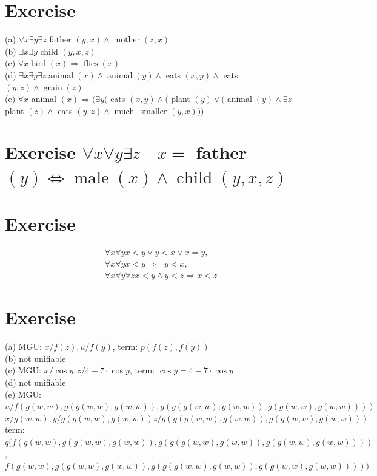 \documentclass[10pt]{book}
\begin{document}
\section{Exercise}
(a) $\forall x \exists y \exists z$ father $(y, x) \wedge \operatorname{mother}(z, x)$\\
(b) $\exists x \exists y$ child $(y, x, z)$\\
(c) $\forall x \operatorname{bird}(x) \Rightarrow \operatorname{flies}(x)$\\
(d) $\exists x \exists y \exists z \operatorname{animal}(x) \wedge \operatorname{animal}(y) \wedge$ eats $(x, y) \wedge$ eats $(y, z) \wedge \operatorname{grain}(z)$\\
(e) $\forall x$ animal $(x) \Rightarrow(\exists y($ eats $(x, y) \wedge($ plant $(y) \vee(\operatorname{animal}(y) \wedge \exists z$ plant $(z) \wedge$ eats $(y, z) \wedge$ much\_smaller $(y, x)))$

\section{Exercise $\forall x \forall y \exists z \quad x=$ father $(y) \Leftrightarrow \operatorname{male}(x) \wedge \operatorname{child}(y, x, z)$}
\section{Exercise}
$$
\begin{aligned}
& \forall x \forall y x<y \vee y<x \vee x=y, \\
& \forall x \forall y x<y \Rightarrow \neg y<x, \\
& \forall x \forall y \forall z x<y \wedge y<z \Rightarrow x<z
\end{aligned}
$$

\section{Exercise}
(a) MGU: $x / f(z), u / f(y)$, term: $p(f(z), f(y))$\\
(b) not unifiable\\
(c) MGU: $x / \cos y, z / 4-7 \cdot \cos y$, term: $\cos y=4-7 \cdot \cos y$\\
(d) not unifiable\\
(e) MGU: $u / f(g(w, w), g(g(w, w), g(w, w)), g(g(g(w, w), g(w, w)), g(g(w, w), g(w, w))))$ $x / g(w, w), y / g(g(w, w), g(w, w)) z / g(g(g(w, w), g(w, w)), g(g(w, w), g(w, w)))$ term: $q(f(g(w, w), g(g(w, w), g(w, w)), g(g(g(w, w), g(w, w)), g(g(w, w), g(w, w))))$, $f(g(w, w), g(g(w, w), g(w, w)), g(g(g(w, w), g(w, w)), g(g(w, w), g(w, w)))))$
\end{document}
